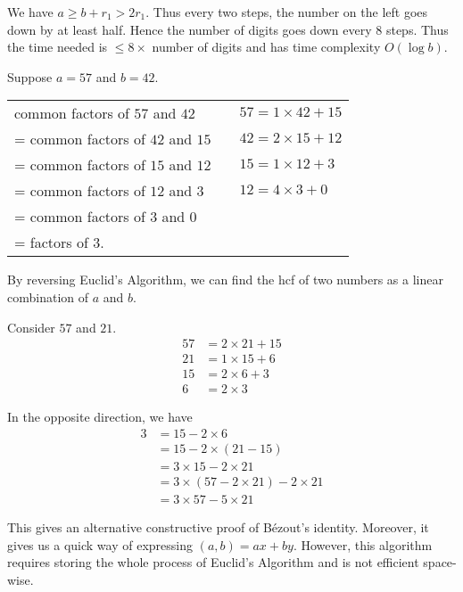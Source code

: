 \documentclass[a4paper]{article}
\begin{document}
  \note We have $a\geq b + r_1 > 2r_1$. Thus every two steps, the number on the left goes down by at least half. Hence the number of digits goes down every 8 steps. Thus the time needed is $\leq 8\times$ number of digits and has time complexity $O(\log b)$.

  \begin{eg}
    Suppose $a = 57$ and $b = 42$. \\
    \begin{tabular}{l l l}
      common factors of $57$ and $42$   &  & $57 = 1\times 42 + 15$ \\
      = common factors of $42$ and $15$ &  & $42 = 2\times 15 + 12$ \\
      = common factors of $15$ and $12$ &  & $15 = 1\times 12 + 3$  \\
      = common factors of $12$ and $3$  &  & $12 = 4\times 3 + 0$   \\
      = common factors of $3$ and $0$                               \\
      = factors of $3$.
    \end{tabular}
  \end{eg}

  By reversing Euclid's Algorithm, we can find the hcf of two numbers as a linear combination of $a$ and $b$.
  \begin{eg}
    Consider $57$ and $21$.
    \begin{align*}
      57 &= 2\times 21 + 15\\
      21 &= 1\times 15 + 6\\
      15 &= 2\times 6 + 3\\
      6 &= 2\times 3
    \end{align*}

    In the opposite direction, we have
    \begin{align*}
      3 &= 15 - 2\times 6\\
      &= 15 - 2\times (21 - 15)\\
      &= 3\times 15 - 2\times 21\\
      &= 3\times (57 - 2\times 21) - 2\times 21\\
      &= 3\times 57 - 5\times 21
    \end{align*}
  \end{eg}

  This gives an alternative constructive proof of B\'{e}zout's identity. Moreover, it gives us a quick way of expressing $(a, b) = ax + by$. However, this algorithm requires storing the whole process of Euclid's Algorithm and is not efficient space-wise.
\end{document}
